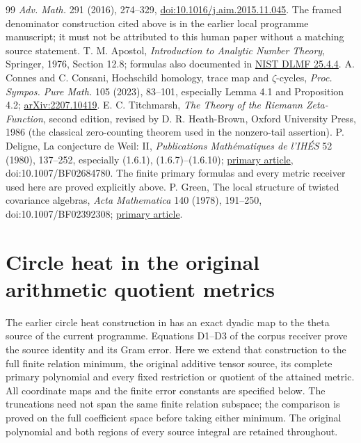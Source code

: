 \documentclass[11pt]{article}
\begin{document}
\begin{thebibliography}{99}
\emph{Adv. Math.} 291 (2016), 274--329,
\href{https://doi.org/10.1016/j.aim.2015.11.045}{doi:10.1016/j.aim.2015.11.045}.
The framed denominator construction cited above is in the earlier local
programme manuscript; it must not be attributed to this human paper
without a matching source statement.
 T. M. Apostol, \emph{Introduction to Analytic Number Theory},
Springer, 1976, Section 12.8; formulas also documented in
\href{https://dlmf.nist.gov/25.4.E4}{NIST DLMF 25.4.4}.
 A. Connes and C. Consani, Hochschild homology,
trace map and $\zeta$-cycles, \emph{Proc. Sympos. Pure Math.} 105
(2023), 83--101, especially Lemma 4.1 and Proposition 4.2;
\href{https://arxiv.org/abs/2207.10419}{arXiv:2207.10419}.
 E. C. Titchmarsh, \emph{The Theory of the Riemann
Zeta-Function}, second edition, revised by D. R. Heath-Brown,
Oxford University Press, 1986 (the classical zero-counting theorem used
in the nonzero-tail assertion).
 P. Deligne, La conjecture de Weil: II,
\emph{Publications Math\'ematiques de l'IH\'ES} 52 (1980), 137--252,
especially (1.6.1), (1.6.7)--(1.6.10);
\href{https://www.numdam.org/item/PMIHES_1980__52__137_0/}{primary article},
doi:10.1007/BF02684780. The finite primary formulas and every metric
receiver used here are proved explicitly above.
 P. Green, The local structure of twisted covariance
algebras, \emph{Acta Mathematica} 140 (1978), 191--250,
doi:10.1007/BF02392308;
\href{https://archive.ymsc.tsinghua.edu.cn/pacm_download/117/6237-11511_2006_Article_BF02392308.pdf}{primary article}.
\end{thebibliography}

\endgroup

\clearpage
\begingroup
\def\C{\mathbb C}
\def\R{\mathbb R}
\def\B{\mathscr B}
\def\M{\mathcal M}
\def\PP{\mathcal P}
\def\Hh{\mathcal H}
\def\norm#1{\left\lVert#1\right\rVert}
\section*{Circle heat in the original arithmetic quotient metrics}


The earlier circle heat construction in \cite{hm2:oldcircle} has an exact
dyadic map to the theta source of the current programme. Equations D1--D3
of the corpus receiver \cite{hm2:corpus} prove the source identity and its
Gram error. Here we extend that construction to the full finite relation
minimum, the original additive tensor source, its complete primary
polynomial and every fixed restriction or quotient of the attained metric.
All coordinate maps and the finite error constants are specified below.
The truncations need not span the same finite relation subspace; the
comparison is proved on the full coefficient space before taking either
minimum. The original polynomial and both regions of every source integral
are retained throughout.
\end{document}

